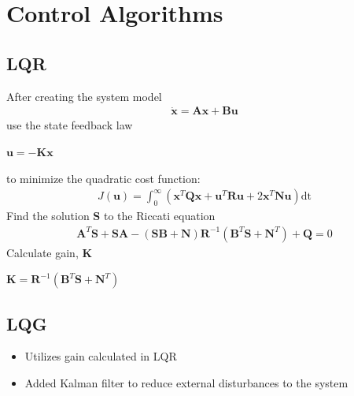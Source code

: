 \chapter{Control Algorithms}

\section{LQR}

    After creating the system model
    \begin{align*}
        \dot{\mathbf{x}} = \mathbf{A}\mathbf{x} + \mathbf{B}\mathbf{u}
    \end{align*}
    use the state feedback law
    \begin{center}
        $\mathbf{u} = -\mathbf{K}\mathbf{x}$
    \end{center}
    to minimize the quadratic cost function:
    \begin{align*}
        J(\mathbf{u}) = \int_0^\infty (\mathbf{x}^T\mathbf{Q}\mathbf{x} + \mathbf{u}^T\mathbf{R}\mathbf{u} + 2\mathbf{x}^T\mathbf{N}\mathbf{u})\mathrm{dt}
    \end{align*}
    Find the solution $\mathbf{S}$ to the Riccati equation
    \begin{align*}
        \mathbf{A}^T\mathbf{S}+\mathbf{SA}-(\mathbf{SB}+\mathbf{N})\mathbf{R}^{-1}(\mathbf{B}^T\mathbf{S}+\mathbf{N}^T)+\mathbf{Q}=0
    \end{align*}    
    Calculate gain, $\mathbf{K}$
    \begin{center}
        $\mathbf{K}=\mathbf{R}^{-1}(\mathbf{B}^T\mathbf{S}+\mathbf{N}^T)$
    \end{center}

\section{LQG}

\begin{itemize}   
    \item Utilizes gain calculated in LQR
    \item Added Kalman filter to reduce external disturbances to the system
\end{itemize}

